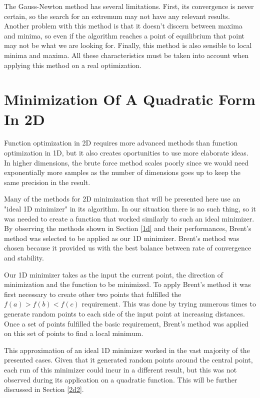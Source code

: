 \documentclass[journal]{IEEEtran}
\begin{document}
The Gauss-Newton method has several limitations. First, its convergence is never certain, so the search for an extremum may not have any relevant results. Another problem with this method is that it doesn't discern between maxima and minima, so even if the algorithm reaches a point of equilibrium that point may not be what we are looking for. Finally, this method is also sensible to local minima and maxima. All these characteristics must be taken into account when applying this method on a real optimization.


\section{Minimization Of A Quadratic Form In 2D} \label{2d}

Function optimization in 2D requires more advanced methods than function optimization in 1D, but it also creates oportunities to use more elaborate ideas. In higher dimensions, the brute force method scales poorly since we would need exponentially more samples as the number of dimensions goes up to keep the same precision in the result.

Many of the methods for 2D minimization that will be presented here use an "ideal 1D minimizer" in its algorithm. In our situation there is no such thing, so it was needed to create a function that worked similarly to such an ideal minimizer. By observing the methods shown in Section \ref{1d} and their performances, Brent's method was selected to be applied as our 1D minimizer. Brent's method was chosen because it provided us with the best balance between rate of convergence and stability.

Our 1D minimizer takes as the input the current point, the direction of minimization and the function to be minimized. To apply Brent's method it was first necessary to create other two points that fulfilled the $f(a)>f(b)<f(c)$ requirement. This was done by trying numerous times to generate random points to each side of the input point at increasing distances. Once a set of points fulfilled the basic requirement, Brent's method was applied on this set of points to find a local minimum.

This approximation of an ideal 1D minimizer worked in the vast majority of the presented cases. Given that it generated random points around the central point, each run of this minimizer could incur in a different result, but this was not observed during its application on a quadratic function. This will be further discussed in Section \ref{2d2}.
\end{document}
